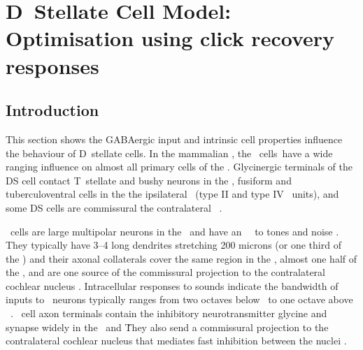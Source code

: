 \section[DS Cell Model]{D~Stellate Cell Model: Optimisation using click recovery responses}   \label{sec:d-stellate-cell-model}

\subsection{Introduction}

This section shows the GABAergic input and intrinsic cell properties influence the behaviour of D~stellate cells.
In the mammalian \CN, the \VCN~\DS cells~have a wide ranging influence on almost all primary cells of the \CN\@.  
Glycinergic terminals of the DS cell contact T~stellate and bushy neurons in the \VCN \citep{RhodeSmithEtAl:1983}, fusiform and tuberculoventral cells in the the ipsilateral \DCN~(type II and type IV \EIRA~units), and some DS cells are commissural the contralateral \CN~\citep{NeedhamPaolini:2007}.



\DS~cells are large multipolar neurons in the \VCN~and have an \OnC~\PSTH~to tones and noise \citep{SmithRhode:1989,NeedhamPaolini:2006}.
They typically have 3--4 long dendrites stretching 200 microns (or one third of the \VCN) and their axonal collaterals cover the same region in the \VCN, almost one half of the \DCN, and are one source of the commissural projection to the contralateral cochlear nucleus \citep{Cant:1992,Cant:1981,SchofieldCant:1996,CantBenson:2003,NeedhamPaolini:2007,PaoliniClark:1999}.
Intracellular responses to sounds indicate the bandwidth of inputs to \DS~neurons typically ranges from two octaves below \CF~to one octave above \CF~\citep{PalmerJiangEtAl:1996,JiangPalmerEtAl:1996,PaoliniClark:1999}.
\DS~cell axon terminals contain the inhibitory neurotransmitter glycine and synapse widely in the \VCN~and \DCN\.
They also send a commissural projection to the contralateral cochlear nucleus that mediates fast inhibition between the nuclei \citep{NeedhamPaolini:2003,NeedhamPaolini:2006,Oertel:1997}.

